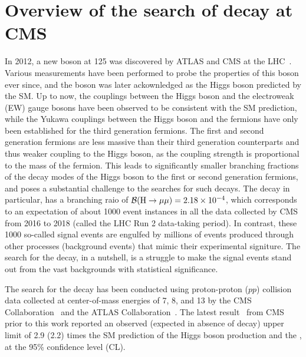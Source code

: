 \chapter{Overview of the search of \texorpdfstring{\hmm}{H to muons} decay at CMS}\label{chp:hmm_overview}

In 2012, a new boson at 125 \GeV was discovered by ATLAS and CMS at the LHC~\cite{Aad:2012tfa, Chatrchyan:2012xdj, Chatrchyan:2013lba}. 
Various measurements have been performed to probe the properties of this boson ever since, 
and the boson was later ackownledged as the Higgs boson predicted by the SM.
Up to now, the couplings between the Higgs boson and the electroweak (EW) gauge bosons have been observed to be consistent with the SM prediction, 
while the Yukawa couplings between the Higgs boson and the fermions have only been established for the third generation fermions. 
The first and second generation fermions are less massive than their third generation counterparts and thus weaker coupling to the Higgs boson, 
as the coupling strength is proportional to the mass of the fermion.
This leads to significantly smaller branching fractions of the decay modes of the Higgs boson to the first or second generation fermions, 
and poses a substantial challenge to the searches for such decays.  
The \hmm decay in particular, has a branching raio of ${{\mathcal{B}(\mathrm{H} \to \mu\mu)} = 2.18 \times 10^{-4}}$, 
which corresponds to an expectation of about 1000 event instances in all the data collected by CMS from 2016 to 2018 (called the LHC Run 2 data-taking period).
In contrast, these 1000 so-called signal events are engulfed by millions of events produced through other processes (background events) that mimic their experimental signiture.
The search for the \hmm decay, in a nutshell, is a struggle to make the signal events stand out from the vast backgrounds with statistical significance.

The search for the \hmm decay has been conducted using proton-proton ($pp$) collision data collected at center-of-mass energies of 7, 8, and 13 \TeV
by the CMS Collaboration~\cite{2015184, PhysRevLett.122.021801} and the ATLAS Collaboration~\cite{201468, PhysRevLett.119.051802, Aad:2020xfq}.
The latest result~\cite{PhysRevLett.122.021801} from CMS prior to this work reported an observed (expected in absence of \hmm decay) upper limit of 2.9 (2.2) times the 
SM prediction of the Higgs boson production and the \brhmm, at the 95\% confidence level (CL).

